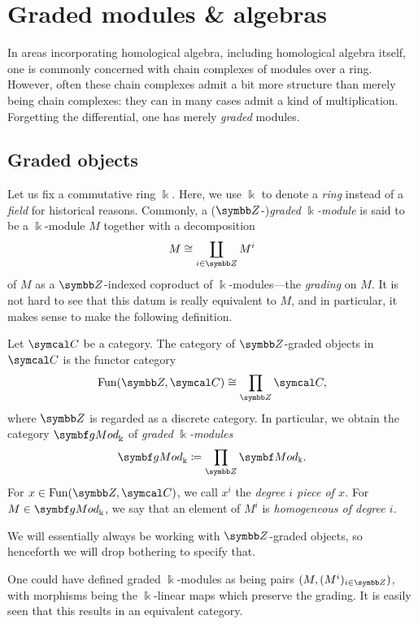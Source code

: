 
\section{Graded modules \& algebras}\label{lecture:graded-algebra}
In areas incorporating homological algebra, including homological algebra itself, one is commonly concerned with chain complexes of modules over a ring.
However, often these chain complexes admit a bit more structure than merely being chain complexes: they can in many cases admit a kind of multiplication.
Forgetting the differential, one has merely \emph{graded} modules.

\subsection{Graded objects}
Let us fix a commutative ring \(\Bbbk\). Here, we use \(\Bbbk\) to denote a \emph{ring} instead of a \emph{field} for historical reasons.
Commonly, a (\(\Z\)-)\emph{graded} \(\Bbbk\)\emph{-module} is said to be a \(\Bbbk\)-module \(M\) together with a decomposition
\[ M \cong \coprod_{i\in\Z}M^i \]
of \(M\) as a \(\Z\)-indexed coproduct of \(\Bbbk\)-modules---the \emph{grading} on \(M\). It is not hard to see that this datum is really equivalent to \(M\), and
in particular, it makes sense to make the following definition.
\begin{definition}
	Let \(\calC\) be a category. The category of \(\Z\)-graded objects in \(\calC\) is the functor category
	\[ \Fun(\Z,\calC) \cong \prod_{\Z}\calC, \]
	where \(\Z\) is regarded as a discrete category. In particular, we obtain the category \(\gMod_\Bbbk\) of \emph{graded} \(\Bbbk\)\emph{-modules}
	\[ \gMod_{\Bbbk} \coloneq \prod_{\Z}\Mod_{\Bbbk}. \]
	For \(x\in\Fun(\Z,\calC)\), we call \(x^i\) the \emph{degree \(i\) piece of \(x\).} For \(M\in\gMod_\Bbbk\), we say that an element
	of \(M^i\) is \emph{homogeneous of degree \(i\).}
\end{definition}
\begin{remark}
	We will essentially always be working with \(\Z\)-graded objects, so henceforth we will drop bothering to specify that.
\end{remark}
\begin{remark}
	One could have defined graded \(\Bbbk\)-modules as being pairs \((M,(M^i)_{i\in\Z})\), with morphisms being the \(\Bbbk\)-linear maps
	which preserve the grading. It is easily seen that this results in an equivalent category.
\end{remark}

